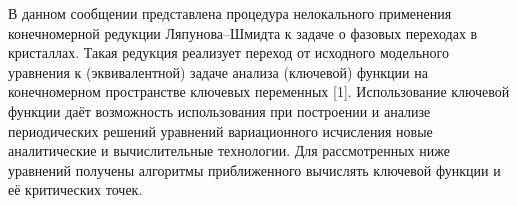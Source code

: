 


\vzmscaption

В данном сообщении представлена процедура нелокального применения
конечномерной редукции Ляпунова--Шми\-д\-та к задаче о фазовых
переходах в кристаллах. Такая редукция реализует переход от
исходного модельного уравнения к (эквивалентной) задаче анализа
(ключевой) функции на конечномерном пространстве ключевых переменных
[1]. Использование ключевой функции даёт возможность использования
при построении и анализе периодических решений уравнений
вариационного исчисления новые аналитические и вычислительные
технологии. Для рассмотренных ниже уравнений получены алгоритмы
приближенного вычислять ключевой функции и её критических точек.


